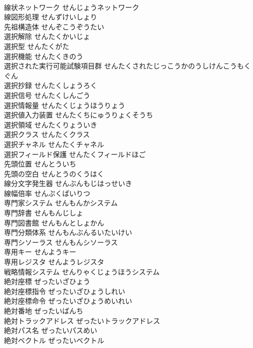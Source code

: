 \documentclass[8pt]{extreport}
\begin{document}
\begin{CJK}{UTF8}{min}
\\	線状ネットワーク	せんじょうネットワーク	
\\	線図形処理	せんずけいしょり	
\\	先祖構造体	せんぞこうぞうたい	
\\	選択解除	せんたくかいじょ	
\\	選択型	せんたくがた	
\\	選択機能	せんたくきのう	
\\	選択された実行可能試験項目群	せんたくされたじっこうかのうしけんこうもくぐん	
\\	選択抄録	せんたくしょうろく	
\\	選択信号	せんたくしんごう	
\\	選択情報量	せんたくじょうほうりょう	
\\	選択値入力装置	せんたくちにゅうりょくそうち	
\\	選択領域	せんたくりょういき	
\\	選択クラス	せんたくクラス	
\\	選択チャネル	せんたくチャネル	
\\	選択フィールド保護	せんたくフィールドほご	
\\	先頭位置	せんとういち	
\\	先頭の空白	せんとうのくうはく	
\\	線分文字発生器	せんぶんもじはっせいき	
\\	線幅倍率	せんぷくばいりつ	
\\	専門家システム	せんもんかシステム	
\\	専門辞書	せんもんじしょ	
\\	専門図書館	せんもんとしょかん	
\\	専門分類体系	せんもんぶんるいたいけい	
\\	専門シソーラス	せんもんシソーラス	
\\	専用キー	せんようキー	
\\	専用レジスタ	せんようレジスタ	
\\	戦略情報システム	せんりゃくじょうほうシステム	
\\	絶対座標	ぜったいざひょう	
\\	絶対座標指令	ぜったいざひょうしれい	
\\	絶対座標命令	ぜったいざひょうめいれい	
\\	絶対番地	ぜったいばんち	
\\	絶対トラックアドレス	ぜったいトラックアドレス	
\\	絶対パス名	ぜったいパスめい	
\\	絶対ベクトル	ぜったいベクトル	

\end{CJK}
\end{document}
